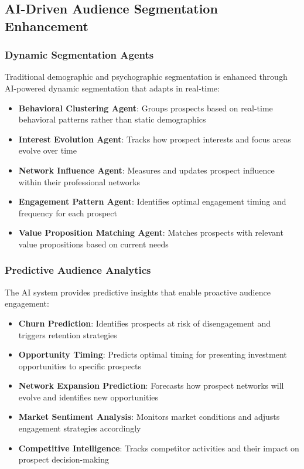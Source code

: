 \subsection{AI-Driven Audience Segmentation Enhancement}

\subsubsection{Dynamic Segmentation Agents}

Traditional demographic and psychographic segmentation is enhanced through AI-powered dynamic segmentation that adapts in real-time:

\begin{itemize}
    \item \textbf{Behavioral Clustering Agent}: Groups prospects based on real-time behavioral patterns rather than static demographics
    \item \textbf{Interest Evolution Agent}: Tracks how prospect interests and focus areas evolve over time
    \item \textbf{Network Influence Agent}: Measures and updates prospect influence within their professional networks
    \item \textbf{Engagement Pattern Agent}: Identifies optimal engagement timing and frequency for each prospect
    \item \textbf{Value Proposition Matching Agent}: Matches prospects with relevant value propositions based on current needs
\end{itemize}

\subsubsection{Predictive Audience Analytics}

The AI system provides predictive insights that enable proactive audience engagement:

\begin{itemize}
    \item \textbf{Churn Prediction}: Identifies prospects at risk of disengagement and triggers retention strategies
    \item \textbf{Opportunity Timing}: Predicts optimal timing for presenting investment opportunities to specific prospects
    \item \textbf{Network Expansion Prediction}: Forecasts how prospect networks will evolve and identifies new opportunities
    \item \textbf{Market Sentiment Analysis}: Monitors market conditions and adjusts engagement strategies accordingly
    \item \textbf{Competitive Intelligence}: Tracks competitor activities and their impact on prospect decision-making
\end{itemize}

